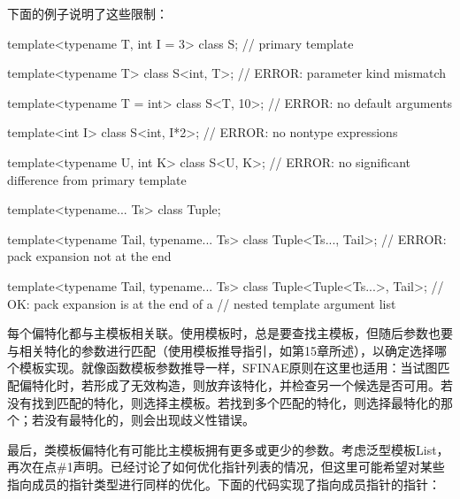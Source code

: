 下面的例子说明了这些限制：

\begin{cpp}
template<typename T, int I = 3>
class S; // primary template

template<typename T>
class S<int, T>; // ERROR: parameter kind mismatch

template<typename T = int>
class S<T, 10>; // ERROR: no default arguments

template<int I>
class S<int, I*2>; // ERROR: no nontype expressions

template<typename U, int K>
class S<U, K>; // ERROR: no significant difference from primary template

template<typename... Ts>
class Tuple;

template<typename Tail, typename... Ts>
class Tuple<Ts..., Tail>; // ERROR: pack expansion not at the end

template<typename Tail, typename... Ts>
class Tuple<Tuple<Ts...>, Tail>; // OK: pack expansion is at the end of a
								// nested template argument list
\end{cpp}

每个偏特化都与主模板相关联。使用模板时，总是要查找主模板，但随后参数也要与相关特化的参数进行匹配（使用模板推导指引，如第15章所述），以确定选择哪个模板实现。就像函数模板参数推导一样，SFINAE原则在这里也适用：当试图匹配偏特化时，若形成了无效构造，则放弃该特化，并检查另一个候选是否可用。若没有找到匹配的特化，则选择主模板。若找到多个匹配的特化，则选择最特化的那个；若没有最特化的，则会出现歧义性错误。

最后，类模板偏特化有可能比主模板拥有更多或更少的参数。考虑泛型模板List，再次在点\#1声明。已经讨论了如何优化指针列表的情况，但这里可能希望对某些指向成员的指针类型进行同样的优化。下面的代码实现了指向成员指针的指针：



